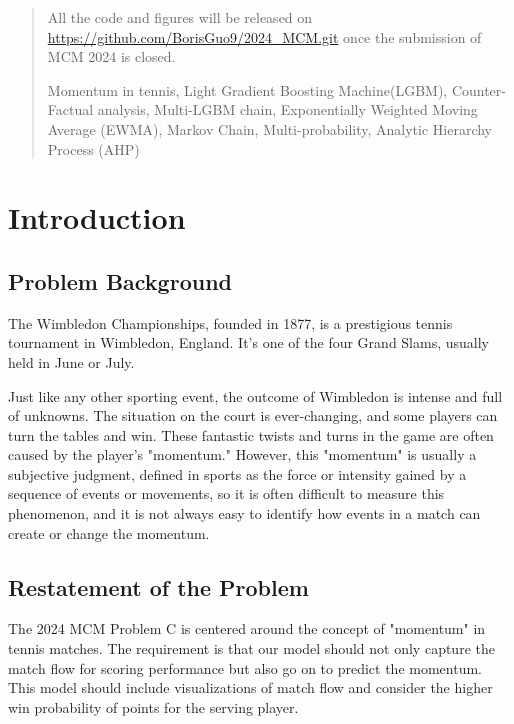 \documentclass{mcmthesis}
\begin{document}
\begin{abstract}
All the code and figures will be released on \url{https://github.com/BorisGuo9/2024_MCM.git} once the submission of MCM 2024 is closed.

\begin{keywords}
Momentum in tennis, Light Gradient Boosting Machine(LGBM), Counter-Factual analysis, Multi-LGBM chain, Exponentially Weighted Moving Average (EWMA), Markov Chain, Multi-probability, Analytic Hierarchy Process (AHP)
\end{keywords}
\end{abstract}
\maketitle
\tableofcontents
\newpage

\section{Introduction}
\subsection{Problem Background}
The Wimbledon Championships, founded in 1877, is a prestigious tennis tournament in Wimbledon, England. It's one of the four Grand Slams, usually held in June or July.

Just like any other sporting event, the outcome of Wimbledon is intense and full of unknowns. The situation on the court is ever-changing, and some players can turn the tables and win. These fantastic twists and turns in the game are often caused by the player's "momentum." However, this "momentum" is usually a subjective judgment, defined in sports as the force or intensity gained by a sequence of events or movements, so it is often difficult to measure this phenomenon, and it is not always easy to identify how events in a match can create or change the momentum.

\subsection{Restatement of the Problem}
The 2024 MCM Problem C is centered around the concept of "momentum" in tennis matches. The requirement is that our model should not only capture the match flow for scoring performance but also go on to predict the momentum. This model should include visualizations of match flow and consider the higher win probability of points for the serving player.
\end{document}
